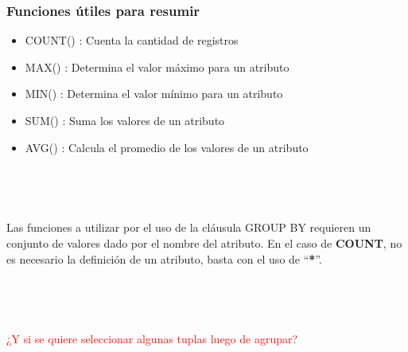 
\begin{frame}[fragile]
	
	\frametitle{Funciones útiles para resumir}
	
	\begin{itemize}
		
		\item COUNT() : Cuenta la cantidad de registros
		
		\item MAX() : Determina el valor máximo para un atributo
		
		\item MIN() : Determina el valor mínimo para un atributo
		
		\item SUM() : Suma los valores de un atributo
		
		\item AVG() : Calcula el promedio de los valores de un atributo
		
	\end{itemize}
	
	\ 
	
	\ 
	
	\pause
	
	Las funciones a utilizar por el uso de la cláusula \textcolor{codepurple}{GROUP BY} requieren un conjunto de valores dado por el nombre del atributo. En el caso de \textbf{COUNT}, no es necesario la definición de un atributo, basta con el uso de ``\textbf{*}''.
	
	\ 
	
	\ 
	
	\pause
	
	\textcolor{red}{¿Y si se quiere seleccionar algunas tuplas luego de agrupar?}
	
\end{frame}


